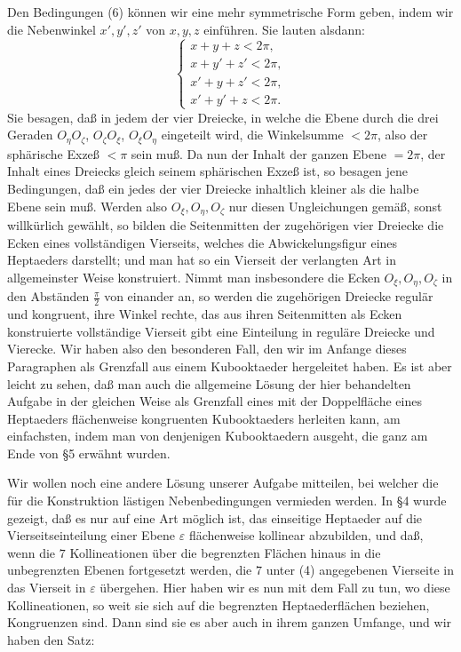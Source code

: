 \documentclass[11pt,a4paper]{article}
\begin{document}
Den Bedingungen (6) k\"onnen wir eine mehr symmetrische Form geben, indem wir die Nebenwinkel $x',y',z'$ von $x,y,z$ einf\"uhren. Sie lauten alsdann:
\[
\left\{
\begin{array}{l}
 x+y+z<2\pi,\\
 x+y'+z'<2\pi,\\
 x'+y+z'<2\pi,\\
 x'+y'+z<2\pi.
\end{array}
\right.\tag{6a}
\]
Sie besagen, da\ss{} in jedem der vier Dreiecke, in welche die Ebene durch die drei Geraden $O_\eta O_\zeta$, $O_\zeta O_\xi$, $O_\xi O_\eta$ eingeteilt wird, die Winkelsumme $<2\pi$, also der sph\"arische Exze\ss{} $<\pi$ sein mu\ss{}. Da nun der Inhalt der ganzen Ebene $=2\pi$, der Inhalt eines Dreiecks gleich seinem sph\"arischen Exze\ss{} ist, so besagen jene Bedingungen, da\ss{} ein jedes der vier Dreiecke inhaltlich kleiner als die halbe Ebene sein mu\ss{}. Werden also $O_\xi,O_\eta,O_\zeta$ nur diesen Ungleichungen gem\"a\ss{}, sonst willk\"urlich gew\"ahlt, so bilden die Seitenmitten der zugeh\"origen vier Dreiecke die Ecken eines vollst\"andigen Vierseits, welches die Abwickelungsfigur eines Heptaeders darstellt; und man hat so ein Vierseit der verlangten Art in allgemeinster Weise konstruiert. Nimmt man insbesondere die Ecken $O_\xi,O_\eta,O_\zeta$ in den Abst\"anden $\frac{\pi}{2}$ von einander an, so werden die zugeh\"origen Dreiecke regul\"ar und kongruent, ihre Winkel rechte, das aus ihren Seitenmitten als Ecken konstruierte vollst\"andige Vierseit gibt eine Einteilung in regul\"are Dreiecke und Vierecke. Wir haben also den besonderen Fall, den wir im Anfange dieses Paragraphen als Grenzfall aus einem Kubooktaeder hergeleitet haben. Es ist aber leicht zu sehen, da\ss{} man auch die allgemeine L\"osung der hier behandelten Aufgabe in der gleichen Weise als Grenzfall eines mit der Doppelfl\"ache eines Heptaeders fl\"achenweise kongruenten Kubooktaeders herleiten kann, am einfachsten, indem man von denjenigen Kubooktaedern ausgeht, die ganz am Ende von \S 5 erw\"ahnt wurden.

Wir wollen noch eine andere L\"osung unserer Aufgabe mitteilen, bei welcher die f\"ur die Konstruktion l\"astigen Nebenbedingungen vermieden werden. In \S 4 wurde gezeigt, da\ss{} es nur auf eine Art m\"oglich ist, das einseitige Heptaeder auf die Vierseitseinteilung einer Ebene $\varepsilon$ fl\"achenweise kollinear abzubilden, und da\ss{}, wenn die $7$ Kollineationen \"uber die begrenzten Fl\"achen hinaus in die unbegrenzten Ebenen fortgesetzt werden, die $7$ unter (4) angegebenen Vierseite in das Vierseit in $\varepsilon$ \"ubergehen. Hier haben wir es nun mit dem Fall zu tun, wo diese Kollineationen, so weit sie sich auf die begrenzten Heptaederfl\"achen beziehen, Kongruenzen sind. Dann sind sie es aber auch in ihrem ganzen Umfange, und wir haben den Satz:
\end{document}
